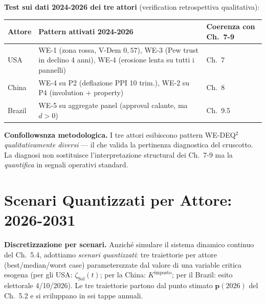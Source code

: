\Proved{} \textbf{Test sui dati 2024-2026 dei tre attori} (verification
retrospettiva qualitativa):

{\def\LTcaptype{none} %
{\small\begin{longtable}[]{@{}
  >{\raggedright\arraybackslash}p{}
  >{\raggedright\arraybackslash}p{}
  >{\raggedright\arraybackslash}p{}@{}}
\toprule\noalign{}
\begin{minipage}[b]{\linewidth}\raggedright
Attore
\end{minipage} & \begin{minipage}[b]{\linewidth}\raggedright
Pattern attivati 2024-2026
\end{minipage} & \begin{minipage}[b]{\linewidth}\raggedright
Coerenza con Ch.~7-9
\end{minipage} \\
\midrule\noalign{}
\endhead
\bottomrule\noalign{}
\endlastfoot
USA & WE-1 (zona rossa, V-Dem \(0{,}57\)), WE-3 (Pew trust in declino 4
anni), WE-4 (erosione lenta su tutti i pannelli) & \Proved{} Ch.~7 \\
China & WE-4 su P2 (deflazione PPI 10 trim.), WE-2 su P4 (involution +
property) & \Proved{} Ch.~8 \\
Brazil & WE-5 su aggregate panel (approval calante, ma \(d > 0\)) &
\Proved{} Ch.~9.5 \\
\end{longtable}}
}

\Hypoth{} \textbf{Confollowsnza metodologica.} I tre attori esibiscono
pattern WE-DEQ$^2$ \emph{qualitativamente diversi} --- il che valida la
pertinenza diagnostica del cruscotto. La diagnosi non sostituisce
l'interpretazione structural dei Ch.~7-9 ma la \emph{quantifica} in
segnali operativi standard.



\section{Scenari Quantizzati per Attore:
2026-2031}\label{scenari-quantizzati-per-attore-2026-2031}

\Hypoth{} \textbf{Discretizzazione per scenari.} Anziché simulare il
sistema dinamico continuo del Ch.~5.4, adottiamo \emph{scenari
quantizzati}: tre traiettorie per attore (best/median/worst case)
parameterszzate dal valore di una variable critica esogena (per gli USA:
\(\zeta_{\text{Sol}}(t)\); per la China: \(K^{\text{imposto}}\); per il
Brazil: esito elettorale 4/10/2026). Le tre traiettorie partono dal
punto stimato \(\boldsymbol{p}(2026)\) del Ch.~5.2 e si sviluppano in
sei tappe annuali.

